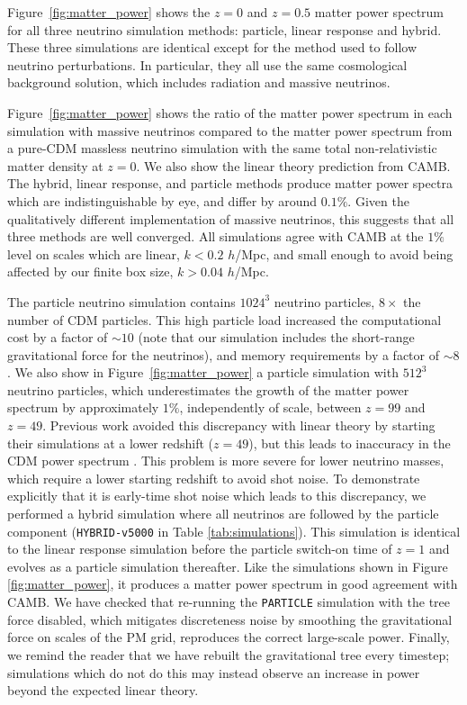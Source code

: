 \documentclass[useAMS, usenatbib]{mnras}
\begin{document}
Figure~\ref{fig:matter_power} shows the $z=0$ and $z=0.5$ matter power spectrum for all three neutrino simulation methods: particle, linear response and hybrid. These three simulations are identical except for the method used to follow neutrino perturbations. In particular, they all use the same cosmological background solution, which includes radiation and massive neutrinos.

Figure~\ref{fig:matter_power} shows the ratio of the matter power spectrum in each simulation with massive neutrinos compared to the matter power spectrum from a pure-CDM massless neutrino simulation with the same total non-relativistic matter density at $z = 0$. We also show the linear theory prediction from CAMB. The hybrid, linear response, and particle methods produce matter power spectra which are indistinguishable by eye, and differ by around $0.1\%$. Given the qualitatively different implementation of massive neutrinos, this suggests that all three methods are well converged. All simulations agree with CAMB at the $1\%$ level on scales which are linear, $k < 0.2$ $h$/Mpc, and small enough to avoid being affected by our finite box size, $k > 0.04$ $h$/Mpc.

The particle neutrino simulation contains $1024^3$ neutrino particles, $8\times$ the number of CDM particles. This high particle load increased the computational cost by a factor of $\sim 10$ (note that our simulation includes the short-range gravitational force for the neutrinos), and memory requirements by a factor of $\sim 8$. We also show in Figure~\ref{fig:matter_power} a particle simulation with $512^3$ neutrino particles, which underestimates the growth of the matter power spectrum by approximately $1\%$, independently of scale, between $z=99$ and $z=49$. Previous work \citep[AHB13;][]{Brandbyge_2008, Viel_2010} avoided this discrepancy with linear theory by starting their simulations at a lower redshift ($z=49$), but this leads to inaccuracy in the CDM power spectrum \citep{Heitmann:2010}. This problem is more severe for lower neutrino masses, which require a lower starting redshift to avoid shot noise. To demonstrate explicitly that it is early-time shot noise which leads to this discrepancy, we performed a hybrid simulation where all neutrinos are followed by the particle component (\texttt{HYBRID-v5000} in Table \ref{tab:simulations}). This simulation is identical to the linear response simulation before the particle switch-on time of $z=1$ and evolves as a particle simulation thereafter. Like the simulations shown in Figure \ref{fig:matter_power}, it produces a matter power spectrum in good agreement with CAMB. We have checked that re-running the \texttt{PARTICLE} simulation with the tree force disabled, which mitigates discreteness noise by smoothing the gravitational force on scales of the PM grid, reproduces the correct large-scale power. Finally, we remind the reader that we have rebuilt the gravitational tree every timestep; simulations which do not do this may instead observe an increase in power beyond the expected linear theory.
\end{document}
